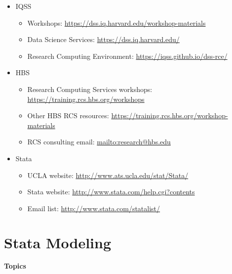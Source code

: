 \documentclass[
]{book}
\providecommand{\tightlist}{%
  \setlength{\itemsep}{0pt}\setlength{\parskip}{0pt}}
\begin{document}
\begin{itemize}
\tightlist
\item
  IQSS

  \begin{itemize}
  \tightlist
  \item
    Workshops: \url{https://dss.iq.harvard.edu/workshop-materials}
  \item
    Data Science Services: \url{https://dss.iq.harvard.edu/}
  \item
    Research Computing Environment: \url{https://iqss.github.io/dss-rce/}
  \end{itemize}
\item
  HBS

  \begin{itemize}
  \tightlist
  \item
    Research Computing Services workshops: \url{https://training.rcs.hbs.org/workshops}
  \item
    Other HBS RCS resources: \url{https://training.rcs.hbs.org/workshop-materials}
  \item
    RCS consulting email: \url{mailto:research@hbs.edu}
  \end{itemize}
\item
  Stata

  \begin{itemize}
  \tightlist
  \item
    UCLA website: \url{http://www.ats.ucla.edu/stat/Stata/}
  \item
    Stata website: \url{http://www.stata.com/help.cgi?contents}
  \item
    Email list: \url{http://www.stata.com/statalist/}
  \end{itemize}
\end{itemize}

\hypertarget{stata-modeling}{%
\chapter{Stata Modeling}\label{stata-modeling}}

\textbf{Topics}
\end{document}
